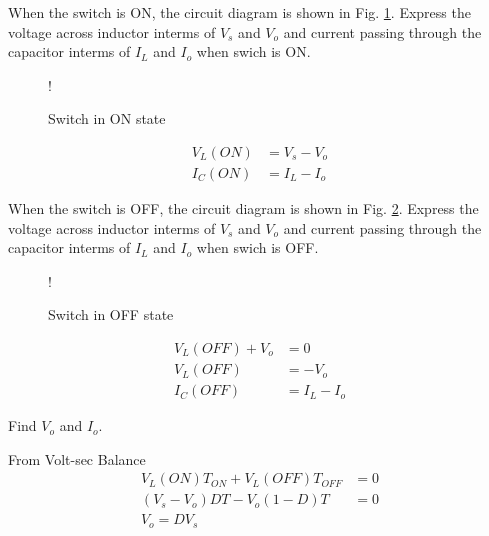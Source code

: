 \documentclass[journal,12pt,twocolumn]{IEEEtran}
\begin{document}
%
\begin{problem}
When the switch is ON, the circuit diagram is shown in Fig. \ref{fig3}. Express the voltage across inductor interms of $V_{s}$ and $V_{o}$ and current passing through the capacitor interms of $I_{L}$ and $I_{o}$ when swich is ON.  
\end{problem}
\begin{figure}[!h]
       \centering  
 \resizebox {\columnwidth} {!} {

}   
    \caption{Switch in ON state}\label{fig3}
   \end{figure} 
  \solution
  \begin{align*}
  V_{L}(ON) &= V_{s} - V_{o}\\
  I_{C}(ON) &= I_{L} - I_{o}
\end{align*} 
\begin{problem}
When the switch is OFF, the circuit diagram is shown in Fig. \ref{fig4}.  Express the voltage across inductor interms of $V_{s}$ and $V_{o}$ and current passing through the capacitor interms of $I_{L}$ and $I_{o}$ when swich is OFF.  
  \end{problem}
%
 \begin{figure}[!h]
       \centering  
\resizebox {\columnwidth} {!} {

} 
    \caption{Switch in OFF state}\label{fig4}
   \end{figure}
  \solution
  \begin{align*}
  V_{L}(OFF) +  V_{o}&=0\\
  V_{L}(OFF) &= - V_{o}\\
  I_{C}(OFF) &= I_{L} - I_{o}
\end{align*}  
\begin{problem}
Find $V_{o}$ and $I_{o}$.
\end{problem} 
\solution
From Volt-sec Balance
 \begin{align*}
  V_{L}(ON)T_{ON} + V_{L}(OFF)T_{OFF}&= 0 \\
  (V_{s} - V_{o})D T-V_{o}(1-D)T &= 0 \\
  V_{o} = DV_{s}
\end{align*} 
\end{document}
